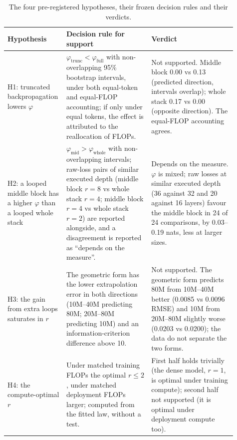 \begin{table}[h]
  \centering
  \caption{The four pre-registered hypotheses, their frozen decision rules and their verdicts.}
  \label{tab:verdicts}
  \footnotesize
  \begin{tabular}{>{\raggedright\arraybackslash}p{0.19\linewidth}p{0.36\linewidth}p{0.36\linewidth}}
    \toprule
    Hypothesis & Decision rule for support & Verdict \\
    \midrule
    H1: truncated backpropagation lowers $\varphi$ & $\varphi_{\mathrm{trunc}} < \varphi_{\mathrm{full}}$ with
    non-overlapping 95\% bootstrap intervals, under both equal-token and equal-FLOP accounting; if only under equal
    tokens, the effect is attributed to the reallocation of FLOPs. & Not supported. Middle block 0.00 vs 0.13 (predicted
    direction, intervals overlap); whole stack 0.17 vs 0.00 (opposite direction). The equal-FLOP accounting agrees. \\
    H2: a looped middle block has a higher $\varphi$ than a looped whole stack & $\varphi_{\mathrm{mid}} >
    \varphi_{\mathrm{whole}}$ with non-overlapping intervals; raw-loss pairs of similar executed depth (middle block
    $r = 8$ vs whole stack $r = 4$; middle block $r = 4$ vs whole stack $r = 2$) are reported alongside, and a
    disagreement is reported as ``depends on the measure''. & Depends on the measure. $\varphi$ is mixed; raw losses at
    similar executed depth (36 against 32 and 20 against 16 layers) favour the middle block in 24 of 24 comparisons, by
    0.03--0.19 nats, less at larger sizes. \\
    H3: the gain from extra loops saturates in $r$ & The geometric form has the lower extrapolation error in both directions (10M--40M
    predicting 80M; 20M--80M predicting 10M) and an information-criterion difference above 10. & Not supported. The
    geometric form predicts 80M from 10M--40M better (0.0085 vs 0.0096 RMSE) and 10M from 20M--80M slightly worse
    (0.0203 vs 0.0200); the data do not separate the two forms. \\
    H4: the compute-optimal $r$ & Under matched training FLOPs the optimal $r \leq 2$, under matched deployment FLOPs
    larger; computed from the fitted law, without a test. & First half holds trivially (the dense model, $r = 1$, is
    optimal under training compute); second half not supported (it is optimal under deployment compute too). \\
    \bottomrule
  \end{tabular}
\end{table}

